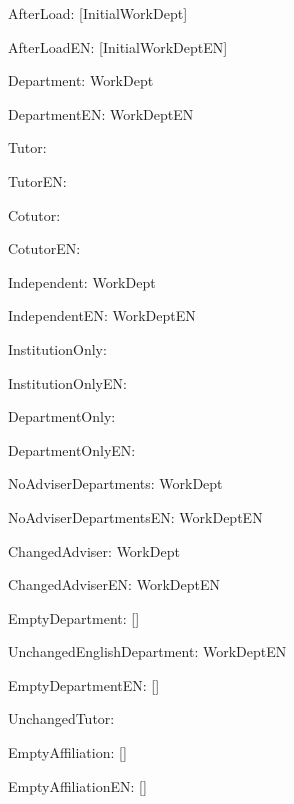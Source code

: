 \documentclass{book}
\let\myDepartment\undefined
\let\myDepartmentEnglish\undefined
\renewcommand{\myDepartment}{InitialWorkDept}
\renewcommand{\myDepartmentEnglish}{InitialWorkDeptEN}
\begin{document}
AfterLoad: [\myDepartment]\par
AfterLoadEN: [\myDepartmentEnglish]\par
\renewcommand{\myDepartment}{WorkDept}
\renewcommand{\myDepartmentEnglish}{WorkDeptEN}
\renewcommand{\myAcademicTutorDepartment}{TutorDept}
\renewcommand{\myAcademicTutorDepartmentEnglish}{TutorDeptEN}
\renewcommand{\myCoTutorDepartment}{CotutorDept}
\renewcommand{\myCoTutorDepartmentEnglish}{CotutorDeptEN}
\renewcommand{\myAcademicTutorInstitution}{TutorInstitution}
\renewcommand{\myAcademicTutorInstitutionEnglish}{TutorInstitutionEN}
\renewcommand{\myCoTutorInstitution}{CotutorInstitution}
\renewcommand{\myCoTutorInstitutionEnglish}{CotutorInstitutionEN}
Department: \myDepartment\par
DepartmentEN: \myDepartmentEnglish\par
Tutor: \AcademicTutorAffiliation\par
TutorEN: \AcademicTutorAffiliationEnglish\par
Cotutor: \AcademicCotutorAffiliation\par
CotutorEN: \AcademicCotutorAffiliationEnglish\par
\renewcommand{\myAcademicTutorDepartment}{}
\renewcommand{\myAcademicTutorDepartmentEnglish}{}
Independent: \myDepartment\par
IndependentEN: \myDepartmentEnglish\par
InstitutionOnly: \AcademicTutorAffiliation\par
InstitutionOnlyEN: \AcademicTutorAffiliationEnglish\par
\renewcommand{\myCoTutorInstitution}{}
\renewcommand{\myCoTutorInstitutionEnglish}{}
DepartmentOnly: \AcademicCotutorAffiliation\par
DepartmentOnlyEN: \AcademicCotutorAffiliationEnglish\par
\renewcommand{\myCoTutorDepartment}{}
\renewcommand{\myCoTutorDepartmentEnglish}{}
NoAdviserDepartments: \myDepartment\par
NoAdviserDepartmentsEN: \myDepartmentEnglish\par
\renewcommand{\myAcademicTutorDepartment}{ChangedTutorDept}
\renewcommand{\myAcademicTutorDepartmentEnglish}{ChangedTutorDeptEN}
ChangedAdviser: \myDepartment\par
ChangedAdviserEN: \myDepartmentEnglish\par
\renewcommand{\myDepartment}{}
EmptyDepartment: [\myDepartment]\par
UnchangedEnglishDepartment: \myDepartmentEnglish\par
\renewcommand{\myDepartmentEnglish}{}
EmptyDepartmentEN: [\myDepartmentEnglish]\par
UnchangedTutor: \AcademicTutorAffiliation\par
EmptyAffiliation: [\AcademicCotutorAffiliation]\par
EmptyAffiliationEN: [\AcademicCotutorAffiliationEnglish]\par
\end{document}
